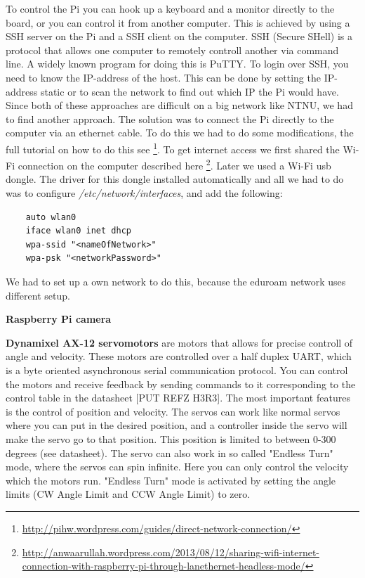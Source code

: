 To control the Pi you can hook up a keyboard and a monitor directly to the board, or you can control it from another computer. 
This is achieved by using a SSH server on the Pi and a SSH client on the computer. 
SSH (Secure SHell) is a protocol that allows one computer to remotely controll another via command line. A widely known program for doing this is PuTTY. To login over SSH, you need to know the IP-address of the host. This can be done by setting the IP-address static or to scan the network to find out which IP the Pi would have. Since both of these approaches are difficult on a big network like NTNU, we had to find another approach. The solution was to connect the Pi directly to the computer via an ethernet cable. To do this we had to do some modifications, the full tutorial on how to do this see \footnote{\url{http://pihw.wordpress.com/guides/direct-network-connection/}}. To get internet access we first shared the Wi-Fi connection on the computer described here \footnote{\url{http://anwaarullah.wordpress.com/2013/08/12/sharing-wifi-internet-connection-with-raspberry-pi-through-lanethernet-headless-mode/}}. Later we used a Wi-Fi usb dongle. The driver for this dongle installed automatically and all we had to do was to configure \textit{/etc/network/interfaces}, and add the following:
\begin{verbatim}
    auto wlan0
    iface wlan0 inet dhcp
    wpa-ssid "<nameOfNetwork>"
    wpa-psk "<networkPassword>"
\end{verbatim}
We had to set up a own network to do this, because the eduroam network uses different setup.
\vspace{\secspace}

\textbf{Raspberry Pi camera}

\vspace{\secspace}

\textbf{Dynamixel AX-12 servomotors}
are motors that allows for precise controll of angle and velocity. These motors are controlled over a half duplex UART, which is a byte oriented asynchronous serial communication protocol. You can control the motors and receive feedback by sending commands to it corresponding to the control table in the datasheet [PUT REFZ H3R3]. The most important features is the control of position and velocity. The servos can work like normal servos where you can put in the desired position, and a controller inside the servo will make the servo go to that position. This position is limited to between 0-300 degrees (see datasheet). The servo can also work in so called "Endless Turn" mode, where the servos can spin infinite. Here you can only control the velocity which the motors run. "Endless Turn" mode is activated by setting the angle limits (CW Angle Limit and CCW Angle Limit) to zero.
\vspace{\secspace}

